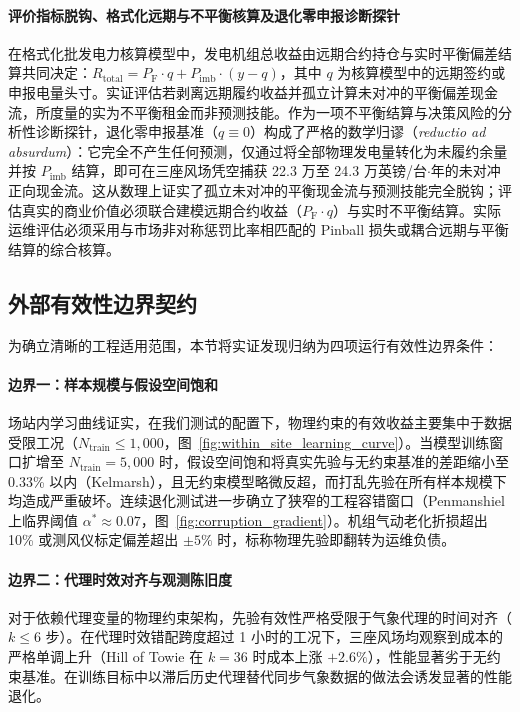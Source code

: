 \paragraph{评价指标脱钩、格式化远期与不平衡核算及退化零申报诊断探针}
在格式化批发电力核算模型中，发电机组总收益由远期合约持仓与实时平衡偏差结算共同决定：$R_{\text{total}} = P_{\text{F}} \cdot q + P_{\text{imb}} \cdot (y - q)$，其中 $q$ 为核算模型中的远期签约或申报电量头寸。实证评估若剥离远期履约收益并孤立计算未对冲的平衡偏差现金流，所度量的实为不平衡租金而非预测技能。作为一项不平衡结算与决策风险的分析性诊断探针，退化零申报基准（$q \equiv 0$）构成了严格的数学归谬（\textit{reductio ad absurdum}）：它完全不产生任何预测，仅通过将全部物理发电量转化为未履约余量并按 $P_{\text{imb}}$ 结算，即可在三座风场凭空捕获 22.3 万至 24.3 万英镑/台$\cdot$年的未对冲正向现金流。这从数理上证实了孤立未对冲的平衡现金流与预测技能完全脱钩；评估真实的商业价值必须联合建模远期合约收益（$P_{\text{F}} \cdot q$）与实时不平衡结算。实际运维评估必须采用与市场非对称惩罚比率相匹配的 Pinball 损失或耦合远期与平衡结算的综合核算。

\subsection{外部有效性边界契约}
\label{sec:boundary_contract}
为确立清晰的工程适用范围，本节将实证发现归纳为四项运行有效性边界条件：

\paragraph{边界一：样本规模与假设空间饱和}
场站内学习曲线证实，在我们测试的配置下，物理约束的有效收益主要集中于数据受限工况（$N_{\text{train}} \le 1,000$，图~\ref{fig:within_site_learning_curve}）。当模型训练窗口扩增至 $N_{\text{train}} = 5{,}000$ 时，假设空间饱和将真实先验与无约束基准的差距缩小至 0.33\% 以内（Kelmarsh），且无约束模型略微反超，而打乱先验在所有样本规模下均造成严重破坏。连续退化测试进一步确立了狭窄的工程容错窗口（Penmanshiel 上临界阈值 $\alpha^* \approx 0.07$，图~\ref{fig:corruption_gradient}）。机组气动老化折损超出 10\% 或测风仪标定偏差超出 $\pm 5\%$ 时，标称物理先验即翻转为运维负债。

\paragraph{边界二：代理时效对齐与观测陈旧度}
对于依赖代理变量的物理约束架构，先验有效性严格受限于气象代理的时间对齐（$k \le 6$ 步）。在代理时效错配跨度超过 1 小时的工况下，三座风场均观察到成本的严格单调上升（Hill of Towie 在 $k=36$ 时成本上涨 $+2.6\%$），性能显著劣于无约束基准。在训练目标中以滞后历史代理替代同步气象数据的做法会诱发显著的性能退化。

